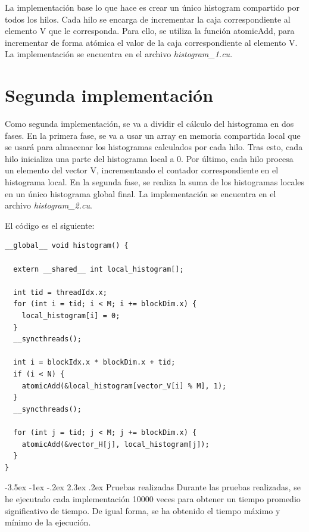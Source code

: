 \documentclass[11pt]{report}
\makeatletter
\renewcommand\chapter{\@startsection{chapter}{0}{\z@}%
    {-3.5ex \@plus -1ex \@minus -.2ex}%
    {2.3ex \@plus.2ex}%
    {\normalfont\Large\bfseries}}
\makeatother
\begin{document}
La implementación base lo que hace es crear un único histogram compartido por todos
los hilos. Cada hilo se encarga de incrementar la caja correspondiente al elemento
V que le corresponda. Para ello, se utiliza la función atomicAdd, para incrementar
de forma atómica el valor de la caja correspondiente al elemento V. La implementación
se encuentra en el archivo \textit{histogram\_1.cu}.

\section{Segunda implementación}
Como segunda implementación, se va a dividir el cálculo del histograma en dos fases.
En la primera fase, se va a usar un array en memoria compartida local que se usará para
almacenar los histogramas calculados por cada hilo. Tras esto, cada hilo inicializa una parte 
del histograma local a 0. Por último, cada hilo procesa un elemento del vector V, incrementando
el contador correspondiente en el histograma local. En la segunda fase, se realiza la suma de
los histogramas locales en un único histograma global final. La implementación se encuentra
en el archivo \textit{histogram\_2.cu}.

El código es el siguiente:
\begin{lstlisting}
__global__ void histogram() {

  extern __shared__ int local_histogram[];

  int tid = threadIdx.x;
  for (int i = tid; i < M; i += blockDim.x) {
    local_histogram[i] = 0;
  }
  __syncthreads();

  int i = blockIdx.x * blockDim.x + tid;
  if (i < N) {
    atomicAdd(&local_histogram[vector_V[i] % M], 1);
  }
  __syncthreads();

  for (int j = tid; j < M; j += blockDim.x) {
    atomicAdd(&vector_H[j], local_histogram[j]);
  }
}
\end{lstlisting}

\chapter{Pruebas realizadas}
Durante las pruebas realizadas, se he ejecutado cada implementación 10000 veces para 
obtener un tiempo promedio significativo de tiempo. De igual forma, se ha obtenido el tiempo
máximo y mínimo de la ejecución. 
\end{document}
